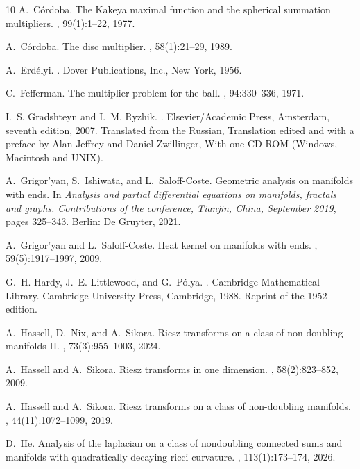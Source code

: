 \documentclass[12pt]{amsart}
\begin{document}
\begin{thebibliography}{10}
	A.~C\'ordoba.
	\newblock The {K}akeya maximal function and the spherical summation
	multipliers.
	, 99(1):1--22, 1977.
	
	A.~C\'ordoba.
	\newblock The disc multiplier.
	, 58(1):21--29, 1989.
	
	A.~Erd\'elyi.
	.
	\newblock Dover Publications, Inc., New York, 1956.
	
	C.~Fefferman.
	\newblock The multiplier problem for the ball.
	, 94:330--336, 1971.
	
	I.~S. Gradshteyn and I.~M. Ryzhik.
	.
	\newblock Elsevier/Academic Press, Amsterdam, seventh edition, 2007.
	\newblock Translated from the Russian, Translation edited and with a preface by
	Alan Jeffrey and Daniel Zwillinger, With one CD-ROM (Windows, Macintosh and
	UNIX).
	
	A.~Grigor'yan, S.~Ishiwata, and L.~Saloff-Coste.
	\newblock Geometric analysis on manifolds with ends.
	\newblock In {\em Analysis and partial differential equations on manifolds,
		fractals and graphs. Contributions of the conference, Tianjin, China,
		September 2019}, pages 325--343. Berlin: De Gruyter, 2021.
	
	A.~Grigor'yan and L.~Saloff-Coste.
	\newblock Heat kernel on manifolds with ends.
	, 59(5):1917--1997, 2009.
	
	G.~H. Hardy, J.~E. Littlewood, and G.~P\'{o}lya.
	.
	\newblock Cambridge Mathematical Library. Cambridge University Press,
	Cambridge, 1988.
	\newblock Reprint of the 1952 edition.
	
	A.~Hassell, D.~Nix, and A.~Sikora.
	\newblock Riesz transforms on a class of non-doubling manifolds {II}.
	, 73(3):955--1003, 2024.
	
	A.~Hassell and A.~Sikora.
	\newblock Riesz transforms in one dimension.
	, 58(2):823--852, 2009.
	
	A.~Hassell and A.~Sikora.
	\newblock Riesz transforms on a class of non-doubling manifolds.
	, 44(11):1072--1099, 2019.
	
	D.~He.
	\newblock Analysis of the laplacian on a class of nondoubling connected sums
	and manifolds with quadratically decaying ricci curvature.
	, 113(1):173–174, 2026.
	

\end{thebibliography}
\end{document}
